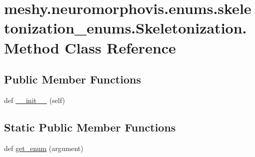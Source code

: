 \hypertarget{classmeshy_1_1neuromorphovis_1_1enums_1_1skeletonization__enums_1_1Skeletonization_1_1Method}{}\section{meshy.\+neuromorphovis.\+enums.\+skeletonization\+\_\+enums.\+Skeletonization.\+Method Class Reference}
\label{classmeshy_1_1neuromorphovis_1_1enums_1_1skeletonization__enums_1_1Skeletonization_1_1Method}


 


\subsection*{Public Member Functions}
\begin{DoxyCompactItemize}
\item 
def \hyperlink{classmeshy_1_1neuromorphovis_1_1enums_1_1skeletonization__enums_1_1Skeletonization_1_1Method_a1952f6f07df0d357eca5c7d3962bb6df}{\+\_\+\+\_\+init\+\_\+\+\_\+} (self)\hypertarget{classmeshy_1_1neuromorphovis_1_1enums_1_1skeletonization__enums_1_1Skeletonization_1_1Method_a1952f6f07df0d357eca5c7d3962bb6df}{}\label{classmeshy_1_1neuromorphovis_1_1enums_1_1skeletonization__enums_1_1Skeletonization_1_1Method_a1952f6f07df0d357eca5c7d3962bb6df}

\end{DoxyCompactItemize}
\subsection*{Static Public Member Functions}
\begin{DoxyCompactItemize}
\item 
def \hyperlink{classmeshy_1_1neuromorphovis_1_1enums_1_1skeletonization__enums_1_1Skeletonization_1_1Method_af8f9aa2061947c64168ade9edede269b}{get\+\_\+enum} (argument)\hypertarget{classmeshy_1_1neuromorphovis_1_1enums_1_1skeletonization__enums_1_1Skeletonization_1_1Method_af8f9aa2061947c64168ade9edede269b}{}\label{classmeshy_1_1neuromorphovis_1_1enums_1_1skeletonization__enums_1_1Skeletonization_1_1Method_af8f9aa2061947c64168ade9edede269b}

\end{DoxyCompactItemize}
